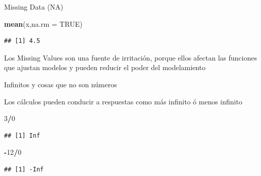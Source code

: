 \documentclass[ignorenonframetext,]{beamer}
\newenvironment{Shaded}{\begin{snugshade}}{\end{snugshade}}
\newcommand{\KeywordTok}[1]{\textcolor[rgb]{0.13,0.29,0.53}{\textbf{#1}}}
\newcommand{\DataTypeTok}[1]{\textcolor[rgb]{0.13,0.29,0.53}{#1}}
\newcommand{\DecValTok}[1]{\textcolor[rgb]{0.00,0.00,0.81}{#1}}
\newcommand{\OtherTok}[1]{\textcolor[rgb]{0.56,0.35,0.01}{#1}}
\newcommand{\OperatorTok}[1]{\textcolor[rgb]{0.81,0.36,0.00}{\textbf{#1}}}
\newcommand{\NormalTok}[1]{#1}
\begin{document}
\begin{frame}[fragile]{Missing Data (NA)}

\begin{Shaded}
\begin{Highlighting}[]
\KeywordTok{mean}\NormalTok{(x,}\DataTypeTok{na.rm =} \OtherTok{TRUE}\NormalTok{)}
\end{Highlighting}
\end{Shaded}

\begin{verbatim}
## [1] 4.5
\end{verbatim}

Los Missing Values son una fuente de irritación, porque ellos afectan
las funciones que ajustan modelos y pueden reducir el poder del
modelamiento

\end{frame}

\begin{frame}[fragile]{Infinitos y cosas que no son números}

Los cálculos pueden conducir a respuestas como más infinito ó menos
infinito

\begin{Shaded}
\begin{Highlighting}[]
\DecValTok{3}\OperatorTok{/}\DecValTok{0}
\end{Highlighting}
\end{Shaded}

\begin{verbatim}
## [1] Inf
\end{verbatim}

\begin{Shaded}
\begin{Highlighting}[]
\OperatorTok{-}\DecValTok{12}\OperatorTok{/}\DecValTok{0}
\end{Highlighting}
\end{Shaded}

\begin{verbatim}
## [1] -Inf
\end{verbatim}

\end{frame}
\end{document}
